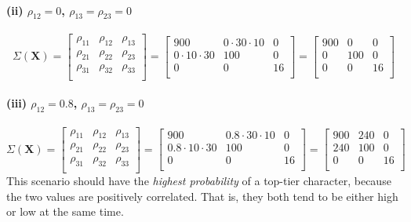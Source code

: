 \documentclass[a4paper,english,12pt]{article}
\begin{document}
\paragraph{(ii)  $\rho_{12} =   0$, $\rho_{13} = \rho_{23} = 0$}
\[
  \Sigma\left(\textbf{X}\right) =
    \begin{bmatrix}
      \rho_{11} & \rho_{12} & \rho_{13} \\
      \rho_{21} & \rho_{22} & \rho_{23} \\
      \rho_{31} & \rho_{32} & \rho_{33} \\
    \end{bmatrix}
  =
    \begin{bmatrix}
                         900 &    0 \cdot 30 \cdot 10 &    0 \\
         0 \cdot 10 \cdot 30 &                    100 &    0 \\
                           0 &                      0 &   16 \\
    \end{bmatrix}
  =
    \begin{bmatrix}
                         900 &                      0 &    0 \\
                           0 &                    100 &    0 \\
                           0 &                      0 &   16 \\
    \end{bmatrix}
\]

\paragraph{(iii) $\rho_{12} = 0.8$, $\rho_{13} = \rho_{23} = 0$}
\[
  \Sigma\left(\textbf{X}\right) =
    \begin{bmatrix}
      \rho_{11} & \rho_{12} & \rho_{13} \\
      \rho_{21} & \rho_{22} & \rho_{23} \\
      \rho_{31} & \rho_{32} & \rho_{33} \\
    \end{bmatrix}
  =
    \begin{bmatrix}
                         900 &  0.8 \cdot 30 \cdot 10 &    0 \\
       0.8 \cdot 10 \cdot 30 &                    100 &    0 \\
                           0 &                      0 &   16 \\
    \end{bmatrix}
  =
    \begin{bmatrix}
                         900 &                    240 &    0 \\
                         240 &                    100 &    0 \\
                           0 &                      0 &   16 \\
    \end{bmatrix}
\]
This scenario should have the \textit{highest probability} of a top-tier
character, because the two values are positively correlated. That is, they both
tend to be either high or low at the same time.
\end{document}
